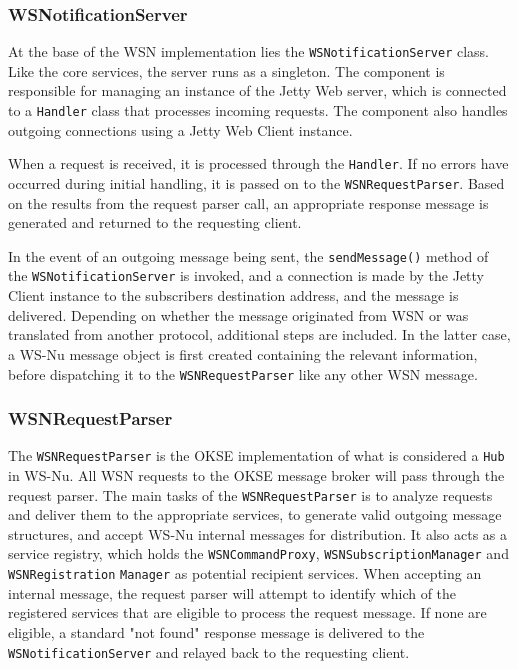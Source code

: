 \subsubsection{WSNotificationServer}
At the base of the WSN implementation lies the \verb!WSNotificationServer! class. Like the core services, the server runs as a singleton. The component is responsible for managing an instance of the Jetty Web server, which is connected to a \verb!Handler! class that processes incoming requests. The component also handles outgoing connections using a Jetty Web Client instance.

When a request is received, it is processed through the \verb!Handler!. If no errors have occurred during initial handling, it is passed on to the \verb!WSNRequestParser!. Based on the results from the request parser call, an appropriate response message is generated and returned to the requesting client.

In the event of an outgoing message being sent, the \verb!sendMessage()! method of the \verb!WSNotification!\verb!Server! is invoked, and a connection is made by the Jetty Client instance to the subscribers destination address, and the message is delivered. Depending on whether the message originated from WSN or was translated from another protocol, additional steps are included. In the latter case, a WS-Nu message object is first created containing the relevant information, before dispatching it to the \verb!WSNRequest!\verb!Parser! like any other WSN message.

\subsubsection{WSNRequestParser}
The \verb!WSNRequestParser! is the OKSE implementation of what is considered a \verb!Hub! in WS-Nu. All WSN requests to the OKSE message broker will pass through the request parser. The main tasks of the \verb!WSNRequestParser! is to analyze requests and deliver them to the appropriate services, to generate valid outgoing message structures, and accept WS-Nu internal messages for distribution. It also acts as a service registry, which holds the \verb!WSNCommandProxy!, \verb!WSNSubscription!\verb!Manager! and \verb!WSNRegistration! \verb!Manager! as potential recipient services. When accepting an internal message, the request parser will attempt to identify which of the registered services that are eligible to process the request message. If none are eligible, a standard "not found" response message is delivered to the \verb!WSNotification!\verb!Server! and relayed back to the requesting client.

